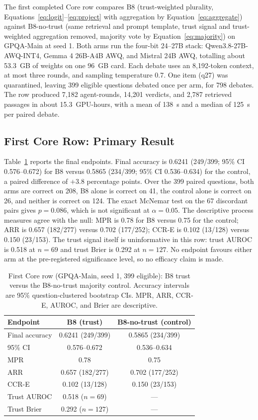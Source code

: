 \documentclass[a4paper,fleqn]{cas-sc}
\begin{document}
The first completed Core row compares B8 (trust-weighted plurality, Equations~\eqref{eq:logit}--\eqref{eq:project} with aggregation by Equation~\eqref{eq:aggregate}) against B8-no-trust (same retrieval and prompt template, trust signal and trust-weighted aggregation removed, majority vote by Equation~\eqref{eq:majority}) on GPQA-Main at seed 1. Both arms run the four-bit 24--27B stack: Qwen3.8-27B-AWQ-INT4, Gemma 4 26B-A4B AWQ, and Mistral 24B AWQ, totalling about 53.3~GB of weights on one 96~GB card. Each debate uses an 8,192-token context, at most three rounds, and sampling temperature 0.7. One item (q27) was quarantined, leaving 399 eligible questions debated once per arm, for 798 debates. The row produced 7,182 agent-rounds, 14,201 verdicts, and 2,787 retrieved passages in about 15.3~GPU-hours, with a mean of 138~s and a median of 125~s per paired debate.

\subsection{First Core Row: Primary Result}

Table~\ref{tab:corerow} reports the final endpoints. Final accuracy is 0.6241 (249/399; 95\% CI 0.576--0.672) for B8 versus 0.5865 (234/399; 95\% CI 0.536--0.634) for the control, a paired difference of $+$3.8 percentage points. Over the 399 paired questions, both arms are correct on 208, B8 alone is correct on 41, the control alone is correct on 26, and neither is correct on 124. The exact McNemar test on the 67 discordant pairs gives $p=0.086$, which is not significant at $\alpha=0.05$. The descriptive process measures agree with the null: MPR is 0.78 for B8 versus 0.75 for the control; ARR is 0.657 (182/277) versus 0.702 (177/252); CCR-E is 0.102 (13/128) versus 0.150 (23/153). The trust signal itself is uninformative in this row: trust AUROC is 0.518 at $n=69$ and trust Brier is 0.292 at $n=127$. No endpoint favours either arm at the pre-registered significance level, so no efficacy claim is made.

\begin{table}[htbp]
  \centering
  \caption{First Core row (GPQA-Main, seed 1, 399 eligible): B8 trust versus the B8-no-trust majority control. Accuracy intervals are 95\% question-clustered bootstrap CIs. MPR, ARR, CCR-E, AUROC, and Brier are descriptive.}
  \label{tab:corerow}
  \begin{tabular}{lcc}
    \toprule
    Endpoint & B8 (trust) & B8-no-trust (control) \\
    \midrule
    Final accuracy & 0.6241 (249/399) & 0.5865 (234/399) \\
    95\% CI & 0.576--0.672 & 0.536--0.634 \\
    MPR & 0.78 & 0.75 \\
    ARR & 0.657 (182/277) & 0.702 (177/252) \\
    CCR-E & 0.102 (13/128) & 0.150 (23/153) \\
    Trust AUROC & 0.518 ($n=69$) & --- \\
    Trust Brier & 0.292 ($n=127$) & --- \\
    \bottomrule
  \end{tabular}
\end{table}
\end{document}
